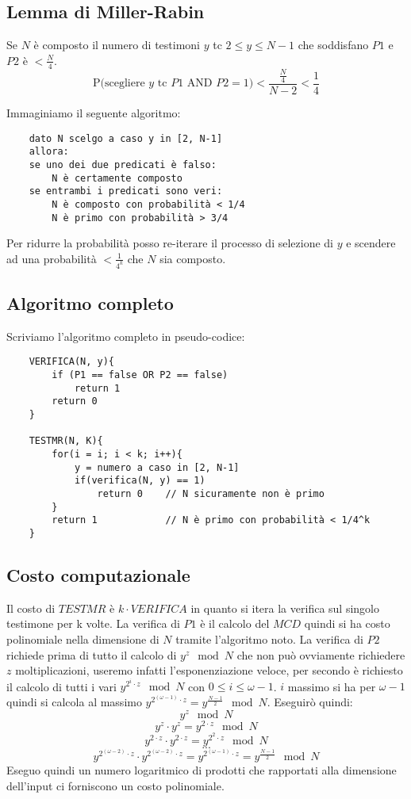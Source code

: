 \subsection{Lemma di Miller-Rabin}
Se $N$ è composto il numero di testimoni $y$ tc $2 \leq y \leq N-1$ che soddisfano $P1$ e $P2$ è $ < \frac{N}{4} $.
$$
    \text{P(scegliere $y$ tc $P1 \text{ AND } P2 = 1$)} < \frac{\frac{N}{4}}{N-2} < \frac{1}{4}
$$

Immaginiamo il seguente algoritmo:
\begin{verbatim}
    dato N scelgo a caso y in [2, N-1]
    allora:
    se uno dei due predicati è falso:
        N è certamente composto
    se entrambi i predicati sono veri:
        N è composto con probabilità < 1/4
        N è primo con probabilità > 3/4
\end{verbatim}

Per ridurre la probabilità posso re-iterare il processo di selezione di $y$ e scendere ad una probabilità
$ < \frac{1}{4^k} $ che $N$ sia composto.

\subsection{Algoritmo completo}
Scriviamo l'algoritmo completo in pseudo-codice:
\begin{verbatim}
    VERIFICA(N, y){
        if (P1 == false OR P2 == false)
            return 1
        return 0
    }
    
    TESTMR(N, K){
        for(i = i; i < k; i++){
            y = numero a caso in [2, N-1]
            if(verifica(N, y) == 1)
                return 0    // N sicuramente non è primo
        }
        return 1            // N è primo con probabilità < 1/4^k
    }
\end{verbatim}

\subsection{Costo computazionale}
Il costo di $TESTMR$ è $k \cdot VERIFICA$ in quanto si itera la verifica sul singolo testimone per k volte. La verifica di $P1$ è il calcolo del $MCD$ quindi si ha costo polinomiale nella dimensione di $N$ tramite l'algoritmo noto. La verifica di $P2$ richiede prima di tutto il calcolo di $y^z \mod N$ che non può ovviamente richiedere $z$ moltiplicazioni, useremo infatti l'esponenziazione veloce, per secondo è richiesto il calcolo di tutti i vari $y^{2^i \cdot z} \mod N$ con $0 \leq i \leq \omega - 1$. $i$ massimo si ha per $\omega - 1$ quindi si calcola al massimo $y^{2^{(\omega-1)} \cdot z} = y^{\frac{N-1}{2}} \mod N$. Eseguirò quindi:
$$ y^{z} \mod N $$
$$ y^{z} \cdot y^{z} = y^{2 \cdot z} \mod N $$
$$ y^{2 \cdot z} \cdot y^{2 \cdot z} = y^{2^{2} \cdot z} \mod N $$
$$ ... $$
$$ y^{2^{(\omega - 2)} \cdot z} \cdot y^{2^{(\omega - 2)} \cdot z} = y^{2^{(\omega - 1)} \cdot z}  = y^{\frac{N-1}{2}}\mod N $$
Eseguo quindi un numero logaritmico di prodotti che rapportati alla dimensione dell'input ci forniscono un costo polinomiale.

